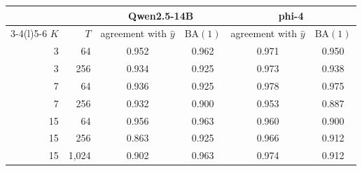 \begin{tabular}{@{}rrcccc@{}}
\toprule
 & & \multicolumn{2}{c}{Qwen2.5-14B} & \multicolumn{2}{c}{phi-4} \\
\cmidrule(lr){3-4}\cmidrule(l){5-6}
$K$ & $T$ & agreement with $\hat y$ & $\mathrm{BA}(1)$ & agreement with $\hat y$ & $\mathrm{BA}(1)$ \\
\midrule
3 & 64 & 0.952 & 0.962 & 0.971 & 0.950 \\
3 & 256 & 0.934 & 0.925 & 0.973 & 0.938 \\
7 & 64 & 0.936 & 0.925 & 0.978 & 0.975 \\
7 & 256 & 0.932 & 0.900 & 0.953 & 0.887 \\
15 & 64 & 0.956 & 0.963 & 0.960 & 0.900 \\
15 & 256 & 0.863 & 0.925 & 0.966 & 0.912 \\
15 & 1{,}024 & 0.902 & 0.963 & 0.974 & 0.912 \\
\bottomrule
\end{tabular}
